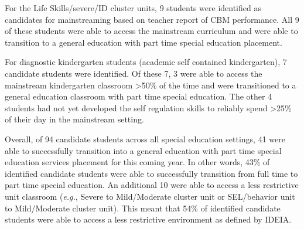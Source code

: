 \documentclass[twoside]{article}
\begin{document}
For the Life Skills/severe/ID cluster units, 9 students were identified as candidates for mainstreaming based on teacher report of CBM performance. All 9 of these students were able to access the mainstream curriculum and were able to transition to a general education with part time special education placement. 

For diagnostic kindergarten students (academic self contained kindergarten), 7 candidate students were identified. Of these 7, 3 were able to access the mainstream kindergarten classroom >50\% of the time and were transitioned to a general education classroom with part time special education. The other 4 students had not yet developed the self regulation skills to reliably spend \textgreater25\% of their day in the mainstream setting. 

Overall, of 94 candidate students across all special education settings, 41 were able to successfully transition into a general education with part time special education services placement for this coming year. In other words, 43\% of identified candidate students were able to successfully transition from full time to part time special education. An additional 10 were able to access a less restrictive unit classroom (\textit{e.g.}, Severe to Mild/Moderate cluster unit or SEL/behavior unit to Mild/Moderate cluster unit). This meant that 54\% of identified candidate students were able to access a less restrictive environment as defined by IDEIA. 
\end{document}
